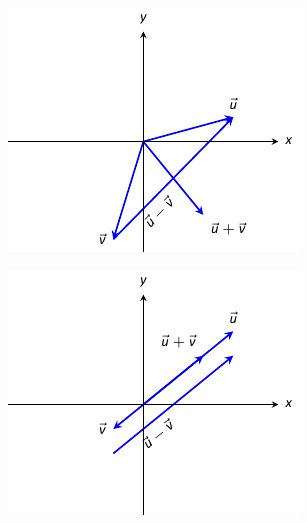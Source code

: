\begin{Answer}
\Question
\begin{minipage}[m]{\linewidth}
\centering
\includegraphics[width=\linewidth/2]{vector_geometry/introduction_to_vectors_and_lines/figures/fig10_02_ex_11ans}
\end{minipage}
\Question
\begin{minipage}[m]{\linewidth}
\centering
\includegraphics[width=\linewidth/2]{vector_geometry/introduction_to_vectors_and_lines/figures/fig10_02_ex_13ans}
\end{minipage}

\end{Answer}
